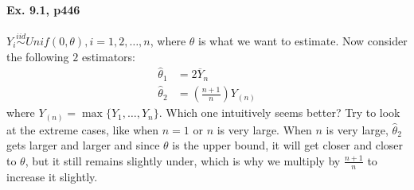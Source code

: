 \documentclass[12 pt]{article}
\begin{document}
  \paragraph{Ex. 9.1, p446}
  $Y_i \stackrel{iid}{\sim}Unif(0,\theta), i=1,2,\ldots,n$, where
  $\theta$ is what we want to estimate. Now consider the following $2$
  estimators:
  \begin{align*}
    \hat{\theta}_1 & = 2 \overline{Y}_n
    \\ \hat{\theta}_2 & = \left(\frac{n+1}{n}\right) Y_{(n)}
  \end{align*}
  where $Y_{(n)}=\max\{Y_1, \ldots, Y_n\}$. Which one intuitively
  seems better? Try to look at the extreme cases, like when $n=1$ or
  $n$ is very large. When $n$ is very large, $\hat{\theta}_2$ gets
  larger and larger and since $\theta$ is the upper bound, it will get
  closer and closer to $\theta$, but it still remains slightly under,
  which is why we multiply by $\frac{n+1}{n}$ to increase it
  slightly.
\end{document}
